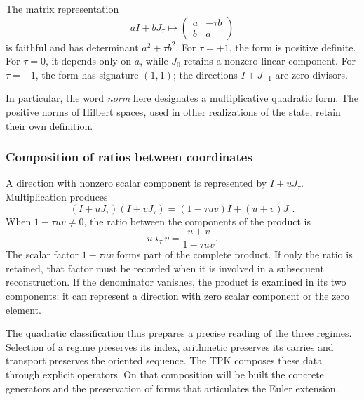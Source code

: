 The matrix representation
\[
 aI+bJ_\tau\longmapsto
 \begin{pmatrix}a&-\tau b\\b&a\end{pmatrix}
\]
is faithful and has determinant \(a^2+\tau b^2\). For \(\tau=+1\), the
form is positive definite. For \(\tau=0\), it depends only on
\(a\), while \(J_0\) retains a nonzero linear component. For
\(\tau=-1\), the form has signature \((1,1)\); the directions
\(I\pm J_{-1}\) are zero divisors.

In particular, the word \emph{norm} here designates a multiplicative quadratic
form. The positive norms of Hilbert spaces, used
in other realizations of the state, retain their own definition.

\subsubsection{Composition of ratios between coordinates}

A direction with nonzero scalar component is represented by
\(I+uJ_\tau\). Multiplication produces
\[
 (I+uJ_\tau)(I+vJ_\tau)
 =(1-\tau uv)I+(u+v)J_\tau.
\]
When \(1-\tau uv\ne0\), the ratio between the components of the product is
\begin{equation}
 u\star_\tau v=\frac{u+v}{1-\tau uv}.
\label{trit:eq:razones}
\end{equation}
The scalar factor \(1-\tau uv\) forms part of the complete product.
If only the ratio is retained, that factor must be recorded when
it is involved in a subsequent reconstruction. If the denominator vanishes,
the product is examined in its two components: it can represent a
direction with zero scalar component or the zero element.

The quadratic classification thus prepares a precise reading of the three
regimes. Selection of a regime preserves its index, arithmetic
preserves its carries and transport preserves the oriented sequence.
The TPK composes these data through explicit operators. On that
composition will be built the concrete generators and the preservation
of forms that articulates the Euler extension.
